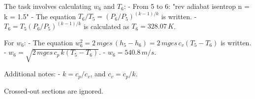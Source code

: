 The task involves calculating \( w_6 \) and \( T_6 \):  
- From 5 to 6: "rev adiabat isentrop n = k = 1.5"  
- The equation \( T_6 / T_5 = (P_6 / P_5)^{(k-1)/k} \) is written.  
- \( T_6 = T_5 (P_6 / P_5)^{(k-1)/k} \) is calculated as \( T_6 = 328.07 \, K \).  

For \( w_6 \):  
- The equation \( w_6^2 = 2 \, mges \, (h_5 - h_6) = 2 \, mges \, c_v (T_5 - T_6) \) is written.  
- \( w_6 = \sqrt{2 \, mges \, c_p \, k (T_5 - T_6)} \).  
- \( w_6 = 540.8 \, m/s \).  

Additional notes:  
- \( k = c_p / c_v \), and \( c_v = c_p / k \).  

Crossed-out sections are ignored.